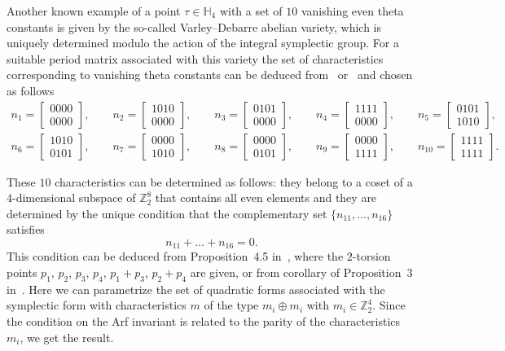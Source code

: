 \documentclass[pdftex]{sigma}
\numberwithin{equation}{section}
\newcommand{\HH}{{\mathbb{H}}}
\newcommand{\ZZ}{{\mathbb{Z}}}
\def\ZZ{{\mathbb Z}}
\begin{document}
Another known example of a point $\tau \in \HH_4$ with a set of $10$ vanishing even theta constants is given by the so-called Varley--Debarre abelian variety, which is uniquely determined modulo the action of the integral symplectic group. For a suitable period matrix associated with this variety the set of characteristics corresponding to vanishing theta constants can be deduced from~\cite{vG2} or~\cite{Be} and chosen as follows
\begin{gather*}
n_1=\begin{bmatrix} 0 0 0 0 \\ 0 0 0 0 \end{bmatrix}, \qquad n_2=\begin{bmatrix} 1 0 1 0 \\ 0 0 0 0 \end{bmatrix}, \qquad n_3=\begin{bmatrix} 0 1 0 1 \\ 0 0 0 0 \end{bmatrix}, \qquad n_4=\begin{bmatrix} 1 1 1 1 \\ 0 0 0 0 \end{bmatrix}, \qquad n_5= \begin{bmatrix} 0 1 0 1 \\ 1 0 1 0 \end{bmatrix}, \\
n_6=\begin{bmatrix} 1 0 1 0 \\ 0 1 0 1 \end{bmatrix}, \qquad n_7=\begin{bmatrix} 0 0 0 0 \\ 1 0 1 0 \end{bmatrix}, \qquad n_8=\begin{bmatrix} 0 0 0 0 \\ 0 1 0 1 \end{bmatrix}, \qquad n_9=\begin{bmatrix} 0 0 0 0 \\ 1 1 1 1 \end{bmatrix}, \qquad n_{10}= \begin{bmatrix} 1 1 1 1 \\ 1 1 1 1 \end{bmatrix}.
\end{gather*}

These $10$ characteristics can be determined as follows: they belong to a coset of a $4$-dimen\-sio\-nal subspace of $\ZZ_2^8$ that contains all even elements and they are determined by the unique condition that the complementary set $\{n_{11},\dots, n_{16}\}$ satisfies
\[
n_{11}+\dots +n_{16}=0.
\]
This condition can be deduced from Proposition~4.5 in~\cite{vG2}, where the $2$-torsion points
 $p_1$, $p_2$, $p_3$, $p_4$, $p_1+p_3$, $p_2+p_4$ are given, or from corollary of Proposition~3 in~\cite{Be}. Here we can parametrize the set of quadratic forms associated with the symplectic form with characteristics $m$ of the type $m_i \oplus m_i$ with $m_i\in \ZZ_2^4$. Since the condition on the Arf invariant is related to the parity of the characteristics~$m_i$, we get the result.
\end{document}
